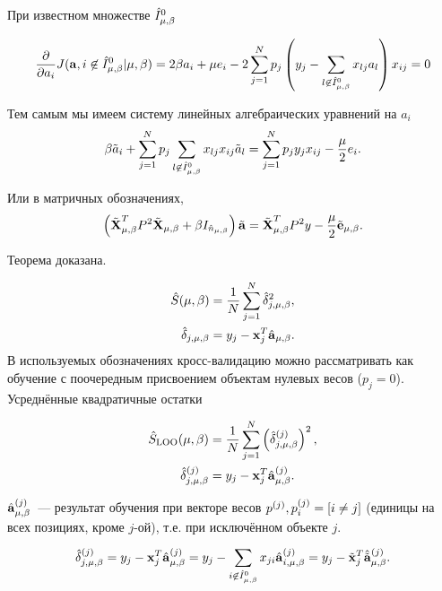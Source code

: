 \begin{theorem}
При известном множестве $\hat I^0_{\mu,\beta}$
\end{theorem}

\begin{align}
	\frac{\partial}{\partial a_i}J(\boldsymbol{\mathbf{a}}, i\not\in \hat I^0_{\mu,\beta} | {\mu,\beta})
		= 2\beta a_i + \mu e_i - 2\sum\limits_{j=1}^N p_j\left(y_j - \sum\limits_{l\not\in \hat I^0_{\mu,\beta}}x_{lj}a_l\right)x_{ij} = 0
\end{align}

Тем самым мы имеем систему линейных алгебраических уравнений на $a_i$
\begin{align}
	\beta \tilde a_i + \sum\limits_{j=1}^N p_j\sum\limits_{l\not\in \hat I^0_{\mu,\beta}} x_{lj}x_{ij}\tilde a_l
		= \sum\limits_{j=1}^N p_jy_jx_{ij} -\frac\mu2 e_i.
\end{align}

Или в матричных обозначениях,
\begin{equation}
	\left(\tilde{\boldsymbol{\mathbf{X}}}^T_{\mu,\beta} P^2\tilde{\boldsymbol{\mathbf{X}}}_{\mu,\beta} + \beta I_{\hat n_{\mu,\beta}}\right) \tilde{\boldsymbol{\mathbf{a}}}
		= \tilde{\boldsymbol{\mathbf{X}}}^T_{\mu,\beta} P^2 y -\frac\mu2\tilde{\boldsymbol{\mathbf{e}}}_{\mu,\beta}.
\end{equation}

Теорема доказана.

\begin{align}
	\hat S({\mu,\beta}) &= \frac1N\sum_{j=1}^N \hat\delta_{j, {\mu,\beta}}^2, \\
	\hat \delta_{j, {\mu,\beta}} &= y_j - \boldsymbol{\mathbf{x}}_j^T \hat {\boldsymbol{\mathbf{a}}}_{\mu,\beta}.
\end{align}
В используемых обозначениях кросс-валидацию можно рассматривать как обучение с поочередным присвоением объектам нулевых весов ($p_j=0$).
Усреднённые квадратичные остатки

\begin{align}
	\hat{S}_{\text{LOO}}({\mu,\beta})&=\frac1N\sum_{j=1}^N\left(\hat{\delta}_{j, {\mu,\beta}}^{(j)}\right)^2, \\
	\hat \delta_{j, {\mu,\beta}}^{(j)} &= y_j - \boldsymbol{\mathbf{x}}_j^T \hat {\boldsymbol{\mathbf{a}}}_{\mu,\beta}^{(j)}.
\end{align}

$\hat {\boldsymbol{\mathbf{a}}}_{{\mu,\beta}}^{(j)}$~--- результат обучения при векторе весов $p^{(j)}, p_i^{(j)} = \left[i \ne j\right]$ (единицы на всех позициях, кроме $j$-ой), т.е. при исключённом объекте $j.$
\def\besta{\hat{\tilde{\mathbf a}}}

\begin{equation}
	\hat \delta_{j, \lams}^{(j)}
		= y_j - \mb x_j^T \hat {\mb a}_\lams^{(j)}
		= y_j - \suml_{i\inotnull} x_{ji} \hat{\mb a}_{i, \lams}^{(j)}
		= y_j - \tilde{\mb x}_j^T \besta_\lams^{(j)}.
\end{equation}

